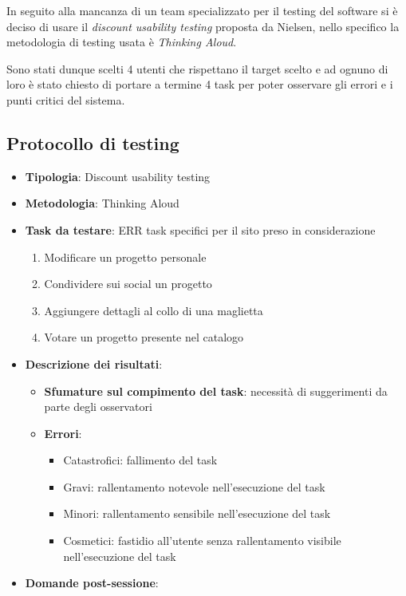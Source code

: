 \documentclass[12pt,italian,]{report}
\providecommand{\tightlist}{%
  \setlength{\itemsep}{0pt}\setlength{\parskip}{0pt}}
\begin{document}
In seguito alla mancanza di un team specializzato per il testing del
software si è deciso di usare il \emph{discount usability testing}
proposta da Nielsen, nello specifico la metodologia di testing usata è
\emph{Thinking Aloud}.

Sono stati dunque scelti 4 utenti che rispettano il target scelto e ad
ognuno di loro è stato chiesto di portare a termine 4 task per poter
osservare gli errori e i punti critici del sistema.

\hypertarget{protocollo-di-testing}{%
\subsection{Protocollo di testing}\label{protocollo-di-testing}}

\begin{itemize}
\item
  \textbf{Tipologia}: Discount usability testing
\item
  \textbf{Metodologia}: Thinking Aloud
\item
  \textbf{Task da testare}: ERR task specifici per il sito preso in
  considerazione

  \begin{enumerate}
  \def\labelenumi{\arabic{enumi}.}
  \tightlist
  \item
    Modificare un progetto personale
  \item
    Condividere sui social un progetto
  \item
    Aggiungere dettagli al collo di una maglietta
  \item
    Votare un progetto presente nel catalogo
  \end{enumerate}
\item
  \textbf{Descrizione dei risultati}:

  \begin{itemize}
  \item
    \textbf{Sfumature sul compimento del task}: necessità di
    suggerimenti da parte degli osservatori
  \item
    \textbf{Errori}:

    \begin{itemize}
    \tightlist
    \item
      Catastrofici: fallimento del task
    \item
      Gravi: rallentamento notevole nell'esecuzione del task
    \item
      Minori: rallentamento sensibile nell'esecuzione del task
    \item
      Cosmetici: fastidio all'utente senza rallentamento visibile
      nell'esecuzione del task
    \end{itemize}
  \end{itemize}
\item
  \textbf{Domande post-sessione}:


\end{itemize}
\end{document}
